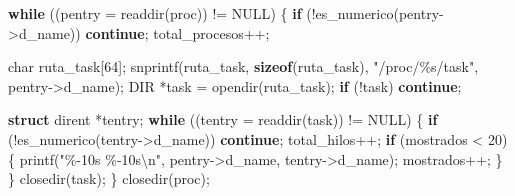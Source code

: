 \documentclass[
  spanish,
]{article}
\newenvironment{Shaded}{}{}
\newcommand{\ControlFlowTok}[1]{\textcolor[rgb]{0.00,0.44,0.13}{\textbf{#1}}}
\newcommand{\DataTypeTok}[1]{\textcolor[rgb]{0.56,0.13,0.00}{#1}}
\newcommand{\DecValTok}[1]{\textcolor[rgb]{0.25,0.63,0.44}{#1}}
\newcommand{\KeywordTok}[1]{\textcolor[rgb]{0.00,0.44,0.13}{\textbf{#1}}}
\newcommand{\NormalTok}[1]{#1}
\newcommand{\OperatorTok}[1]{\textcolor[rgb]{0.40,0.40,0.40}{#1}}
\newcommand{\SpecialCharTok}[1]{\textcolor[rgb]{0.25,0.44,0.63}{#1}}
\newcommand{\StringTok}[1]{\textcolor[rgb]{0.25,0.44,0.63}{#1}}
\begin{document}
\begin{Shaded}
\begin{Highlighting}[]
    \ControlFlowTok{while} \OperatorTok{((}\NormalTok{pentry }\OperatorTok{=}\NormalTok{ readdir}\OperatorTok{(}\NormalTok{proc}\OperatorTok{))} \OperatorTok{!=}\NormalTok{ NULL}\OperatorTok{)} \OperatorTok{\{}
        \ControlFlowTok{if} \OperatorTok{(!}\NormalTok{es\_numerico}\OperatorTok{(}\NormalTok{pentry}\OperatorTok{{-}\textgreater{}}\NormalTok{d\_name}\OperatorTok{))} \ControlFlowTok{continue}\OperatorTok{;}
\NormalTok{        total\_procesos}\OperatorTok{++;}

        \DataTypeTok{char}\NormalTok{ ruta\_task}\OperatorTok{[}\DecValTok{64}\OperatorTok{];}
\NormalTok{        snprintf}\OperatorTok{(}\NormalTok{ruta\_task}\OperatorTok{,} \KeywordTok{sizeof}\OperatorTok{(}\NormalTok{ruta\_task}\OperatorTok{),} \StringTok{"/proc/}\SpecialCharTok{\%s}\StringTok{/task"}\OperatorTok{,}\NormalTok{ pentry}\OperatorTok{{-}\textgreater{}}\NormalTok{d\_name}\OperatorTok{);}
\NormalTok{        DIR }\OperatorTok{*}\NormalTok{task }\OperatorTok{=}\NormalTok{ opendir}\OperatorTok{(}\NormalTok{ruta\_task}\OperatorTok{);}
        \ControlFlowTok{if} \OperatorTok{(!}\NormalTok{task}\OperatorTok{)} \ControlFlowTok{continue}\OperatorTok{;}

        \KeywordTok{struct}\NormalTok{ dirent }\OperatorTok{*}\NormalTok{tentry}\OperatorTok{;}
        \ControlFlowTok{while} \OperatorTok{((}\NormalTok{tentry }\OperatorTok{=}\NormalTok{ readdir}\OperatorTok{(}\NormalTok{task}\OperatorTok{))} \OperatorTok{!=}\NormalTok{ NULL}\OperatorTok{)} \OperatorTok{\{}
            \ControlFlowTok{if} \OperatorTok{(!}\NormalTok{es\_numerico}\OperatorTok{(}\NormalTok{tentry}\OperatorTok{{-}\textgreater{}}\NormalTok{d\_name}\OperatorTok{))} \ControlFlowTok{continue}\OperatorTok{;}
\NormalTok{            total\_hilos}\OperatorTok{++;}
            \ControlFlowTok{if} \OperatorTok{(}\NormalTok{mostrados }\OperatorTok{\textless{}} \DecValTok{20}\OperatorTok{)} \OperatorTok{\{}
\NormalTok{                printf}\OperatorTok{(}\StringTok{"}\SpecialCharTok{\%{-}10s}\StringTok{ }\SpecialCharTok{\%{-}10s\textbackslash{}n}\StringTok{"}\OperatorTok{,}\NormalTok{ pentry}\OperatorTok{{-}\textgreater{}}\NormalTok{d\_name}\OperatorTok{,}\NormalTok{ tentry}\OperatorTok{{-}\textgreater{}}\NormalTok{d\_name}\OperatorTok{);}
\NormalTok{                mostrados}\OperatorTok{++;}
            \OperatorTok{\}}
        \OperatorTok{\}}
\NormalTok{        closedir}\OperatorTok{(}\NormalTok{task}\OperatorTok{);}
    \OperatorTok{\}}
\NormalTok{    closedir}\OperatorTok{(}\NormalTok{proc}\OperatorTok{);}


\end{Highlighting}
\end{Shaded}
\end{document}
